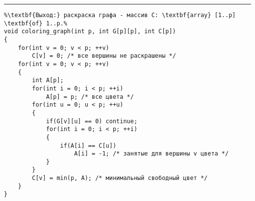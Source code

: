 \vspace{5pt} \hrule
\begin{lstlisting}[caption={Алгоритм последовательного раскрашивания}, label=p359, escapechar=\%]
%\noindent\textbf{Вход:} граф G.\\%
%\textbf{Выход:} раскраска графа - массив C: \textbf{array} [1..p] \textbf{of} 1..p.%
void coloring_graph(int p, int G[p][p], int C[p])
{
	for(int v = 0; v < p; ++v)
		C[v] = 0; /* все вершины не раскрашены */
	for(int v = 0; v < p; ++v)
	{
		int A[p];
		for(int i = 0; i < p; ++i)
			A[p] = p; /* все цвета */
		for(int u = 0; u < p; ++u)
		{
			if(G[v][u] == 0) continue;
			for(int i = 0; i < p; ++i)
			{
				if(A[i] == C[u])
					A[i] = -1; /* занятые для вершины v цвета */
			}
		}
		C[v] = min(p, A); /* минимальный свободный цвет */
	}
}
\end{lstlisting}
